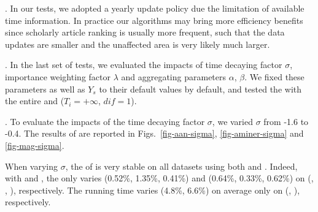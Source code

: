.
In our tests, we adopted a yearly update policy due the limitation of  available time information. In practice our algorithms may bring more efficiency benefits since scholarly article ranking is usually more frequent, such that the data updates are smaller and the unaffected area is very likely much larger.



.
In the last set of tests, we evaluated the impacts of time decaying factor $\sigma$, importance weighting factor $\lambda$ and aggregating parameters $\alpha$, $\beta$. We fixed these parameters as well as $Y_s$ to their default values by default, and tested the \PairAcc with the entire \recom and \fcita (\ie $T_i=+\infty$, $dif=1$).





.
To evaluate the impacts of the time decaying factor $\sigma$, we varied $\sigma$ from -1.6 to -0.4.
The results of \PairAcc are reported in Figs.~\ref{fig-aan-sigma}, \ref{fig-aminer-sigma} and \ref{fig-mag-sigma}.


When varying $\sigma$, the \PairAcc of \ensemblerank is very stable on all datasets using both \recom and \fcita. Indeed, with \recom and \fcita, the \PairAcc only varies (0.52\%, 1.35\%, 0.41\%) and (0.64\%, 0.33\%, 0.62\%) on (\aan, \aminer, \magdata), respectively.
%
The running time varies (4.8\%, 6.6\%) on average only on (\aminer, \magdata), respectively.




